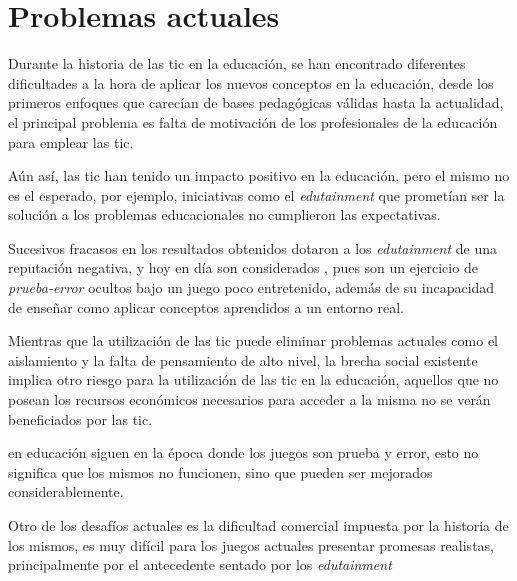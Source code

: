 \section{Problemas actuales}

Durante la historia de las \Gls{tic} en la educación, se han encontrado
diferentes dificultades a la hora de aplicar los nuevos conceptos en la
educación, desde los primeros enfoques que carecían de bases pedagógicas válidas
hasta la actualidad, el principal problema es falta de motivación de los
profesionales de la educación para emplear las
\Gls{tic}\cite{punie:ict}\cite{ict:romeo}.


Aún así, las \Gls{tic} han tenido un impacto positivo en la educación, pero el
mismo no es el esperado\cite{punie:ict}, por ejemplo, iniciativas como el
\emph{edutainment} que prometían ser la solución a los problemas
educacionales no cumplieron las expectativas. 

Sucesivos fracasos en los resultados obtenidos dotaron a los \emph{edutainment}
de una reputación negativa, y hoy en día son considerados , pues son un ejercicio de \emph{prueba-error}
ocultos bajo un juego poco entretenido\cite{resnick:2004}, además de su
incapacidad de enseñar como aplicar conceptos aprendidos a un entorno
real\cite{resnick:2004}.

Mientras que la utilización de las \Gls{tic} puede eliminar problemas actuales
como el aislamiento y la falta de pensamiento de alto nivel\cite{punie:ict}, la
brecha social existente implica otro riesgo para la utilización de las \Gls{tic}
en la educación, aquellos que no posean los recursos económicos necesarios para
acceder a la misma no se verán beneficiados por las \Gls{tic}\cite{punie:ict}.

 en
educación siguen en la época donde los juegos son prueba y error, esto no
significa que los mismos no funcionen, sino que pueden ser mejorados
considerablemente\cite{egenfeldt2007third}.

Otro de los desafíos actuales es la dificultad comercial impuesta por la
historia de los mismos, es muy difícil para los juegos actuales presentar
promesas realistas, principalmente por el antecedente sentado por los
\emph{edutainment}\cite{egenfeldt2007third}
